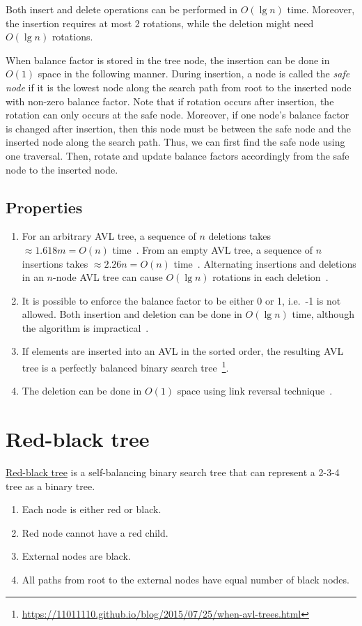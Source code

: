 Both insert and delete operations can be performed in $O(\lg n)$ time. Moreover, the insertion requires at most 2 rotations, while the deletion might need $O(\lg n)$ rotations.

When balance factor is stored in the tree node, the insertion can be done in $O(1)$ space in the following manner. During insertion, a node is called the \emph{safe node} if it is the lowest node along the search path from root to the inserted node with non-zero balance factor. Note that if rotation occurs after insertion, the rotation can only occurs at the safe node. Moreover, if one node's balance factor is changed after insertion, then this node must be between the safe node and the inserted node along the search path. Thus, we can first find the safe node using one traversal. Then, rotate and update balance factors accordingly from the safe node to the inserted node.

\subsection{Properties}
\begin{enumerate}
    \item For an arbitrary AVL tree, a sequence of $n$ deletions takes $\approx 1.618m = O(n)$ time~\cite{Tsakalidis1985}. From an empty AVL tree, a sequence of $n$ insertions takes $\approx 2.26n = O(n)$ time~\cite{Mehlhorn1986}. Alternating insertions and deletions in an $n$-node AVL tree can cause $O(\lg n)$ rotations in each deletion~\cite{Amani2016}.
    \item It is possible to enforce the balance factor to be either 0 or 1, i.e.\ -1 is not allowed. Both insertion and deletion can be done in $O(\lg n)$ time, although the algorithm is impractical~\cite{Zweben1978,Raiha1979}.
    \item If elements are inserted into an AVL in the sorted order, the resulting AVL tree is a perfectly balanced binary search tree~\footnote{\url{https://11011110.github.io/blog/2015/07/25/when-avl-trees.html}}.
    \item The deletion can be done in $O(1)$ space using link reversal technique~\cite{Chen1986}.
\end{enumerate}

\section{Red-black tree}
\href{https://en.wikipedia.org/wiki/Red%E2%80%93black_tree}{Red-black tree} is a self-balancing binary search tree that can represent a 2-3-4 tree as a binary tree.
\begin{enumerate}
    \item Each node is either red or black.
    \item Red node cannot have a red child.
    \item External nodes are black.
    \item All paths from root to the external nodes have equal number of black nodes.
\end{enumerate}

